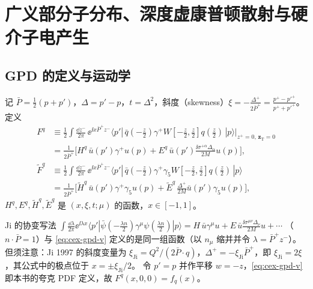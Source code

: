 \section{广义部分子分布、深度虚康普顿散射与硬介子电产生}\label{sec:cex-gpd}

\subsection{GPD 的定义与运动学}

\begin{definition}[夸克 GPD]\label{def:cex-gpd}
记 $\bar P=\frac12(p+p')$，$\Delta=p'-p$，$t=\Delta^2$，斜度（skewness）$\xi=-\frac{\Delta^+}{2\bar P^+}=\frac{p^+-p'^+}{p^++p'^+}$。定义
\begin{align}
F^q&\equiv\frac12\int\frac{\dd z^-}{2\pi}\,\ee^{\ii x\bar P^+z^-}\langle p'|\,\bar q(-\tfrac z2)\gamma^+W[-\tfrac z2,\tfrac z2]q(\tfrac z2)\,|p\rangle\Big|_{z^+=0,\,\bm z_{\mathrm T}=0}\nonumber\\
&=\frac{1}{2\bar P^+}\Big[H^q\,\bar u(p')\gamma^+u(p)+E^q\,\bar u(p')\frac{\ii\sigma^{+\alpha}\Delta_\alpha}{2M}u(p)\Big],\label{eq:cex-gpd-v}\\
\tilde F^q&\equiv\frac12\int\frac{\dd z^-}{2\pi}\,\ee^{\ii x\bar P^+z^-}\langle p'|\,\bar q(-\tfrac z2)\gamma^+\gamma_5W[-\tfrac z2,\tfrac z2]q(\tfrac z2)\,|p\rangle\nonumber\\
&=\frac{1}{2\bar P^+}\Big[\tilde H^q\,\bar u(p')\gamma^+\gamma_5u(p)+\tilde E^q\,\frac{\Delta^+}{2M}\bar u(p')\gamma_5u(p)\Big],\label{eq:cex-gpd-a}
\end{align}
$H^q,E^q,\tilde H^q,\tilde E^q$ 是 $(x,\xi,t;\mu)$ 的函数，$x\in[-1,1]$。
\end{definition}

\begin{remark}\label{rem:cex-gpd-ji}
Ji 的协变写法 $\int\frac{\dd\lambda}{2\pi}\ee^{\ii\lambda x}\langle p'|\bar\psi(-\frac{\lambda n}2)\gamma^\mu\psi(\frac{\lambda n}2)|p\rangle=H\,\bar u\gamma^\mu u+E\,\bar u\frac{\ii\sigma^{\mu\nu}\Delta_\nu}{2M}u+\cdots$
（$n\cdot\bar P=1$）与 \cref{eq:cex-gpd-v} 定义的是同一组函数（以 $n_\mu$ 缩并并令 $\lambda=\bar P^+z^-$）。但须注意：Ji 1997 的斜度变量为
$\xi_{\mathrm{Ji}}=Q^2/(2\bar P\cdot q)$，$\Delta^+=-\xi_{\mathrm{Ji}}\bar P^+$，即 $\xi_{\mathrm{Ji}}=2\xi$，其公式中的极点位于 $x=\pm\xi_{\mathrm{Ji}}/2$。
令 $p'=p$ 并作平移 $w=-z$，\cref{eq:cex-gpd-v} 即本书的夸克 PDF 定义，故 $F^q(x,0,0)=f_q(x)$。
\end{remark}

